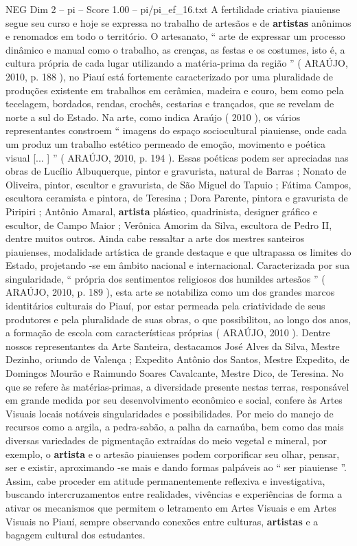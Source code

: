 \begin{textsample}{NEG Dim 2 – pi – Score 1.00 – pi/pi\_ef\_16.txt}
A fertilidade criativa piauiense segue seu curso e hoje se expressa no trabalho de artesãos e de \textbf{artistas} anônimos e renomados em todo o território.
O artesanato, “ arte de expressar um processo dinâmico e manual como o trabalho, as crenças, as festas e os costumes, isto é, a cultura própria de cada lugar utilizando a matéria-prima da região ” ( ARAÚJO, 2010, p. 188 ), no Piauí está fortemente caracterizado por uma pluralidade de produções existente em trabalhos em cerâmica, madeira e couro, bem como pela tecelagem, bordados, rendas, crochês, cestarias e trançados, que se revelam de norte a sul do Estado.
Na arte, como indica Araújo ( 2010 ), os vários representantes constroem “ imagens do espaço sociocultural piauiense, onde cada um produz um trabalho estético permeado de emoção, movimento e poética visual [... ] ” ( ARAÚJO, 2010, p. 194 ).
Essas poéticas podem ser apreciadas nas obras de Lucílio Albuquerque, pintor e gravurista, natural de Barras ; Nonato de Oliveira, pintor, escultor e gravurista, de São Miguel do Tapuio ; Fátima Campos, escultora ceramista e pintora, de Teresina ; Dora Parente, pintora e gravurista de Piripiri ; Antônio Amaral, \textbf{artista} plástico, quadrinista, designer gráfico e escultor, de Campo Maior ; Verônica Amorim da Silva, escultora de Pedro II, dentre muitos outros.
Ainda cabe ressaltar a arte dos mestres santeiros piauienses, modalidade artística de grande destaque e que ultrapassa os limites do Estado, projetando -se em âmbito nacional e internacional.
Caracterizada por sua singularidade, “ própria dos sentimentos religiosos dos humildes artesãos ” ( ARAÚJO, 2010, p. 189 ), esta arte se notabiliza como um dos grandes marcos identitários culturais do Piauí, por estar permeada pela criatividade de seus produtores e pela pluralidade de suas obras, o que possibilitou, ao longo dos anos, a formação de escola com características próprias ( ARAÚJO, 2010 ).
Dentre nossos representantes da Arte Santeira, destacamos José Alves da Silva, Mestre Dezinho, oriundo de Valença ; Expedito Antônio dos Santos, Mestre Expedito, de Domingos Mourão e Raimundo Soares Cavalcante, Mestre Dico, de Teresina.
No que se refere às matérias-primas, a diversidade presente nestas terras, responsável em grande medida por seu desenvolvimento econômico e social, confere às Artes Visuais locais notáveis singularidades e possibilidades.
Por meio do manejo de recursos como a argila, a pedra-sabão, a palha da carnaúba, bem como das mais diversas variedades de pigmentação extraídas do meio vegetal e mineral, por exemplo, o \textbf{artista} e o artesão piauienses podem corporificar seu olhar, pensar, ser e existir, aproximando -se mais e dando formas palpáveis ao “ ser piauiense ”.
Assim, cabe proceder em atitude permanentemente reflexiva e investigativa, buscando intercruzamentos entre realidades, vivências e experiências de forma a ativar os mecanismos que permitem o letramento em Artes Visuais e em Artes Visuais no Piauí, sempre observando conexões entre culturas, \textbf{artistas} e a bagagem cultural dos estudantes.

\end{textsample}
